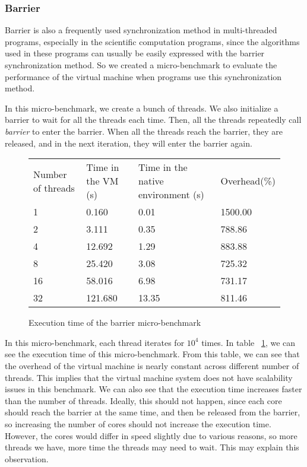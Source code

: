 \subsubsection{Barrier}
Barrier is also a frequently used synchronization method in multi-threaded
programs, especially in the scientific computation programs, since the
algorithms used in these programs can usually be easily expressed with the
barrier synchronization method. So we created a micro-benchmark to evaluate
the performance of the virtual machine when programs use this synchronization
method.

In this micro-benchmark, we create a bunch of threads. We also initialize
a barrier to wait for all the threads each time. Then, all the threads
repeatedly call {\em barrier} to enter the barrier. When all the threads
reach the barrier, they are released, and in the next iteration, they will
enter the barrier again.

\begin{figure}[here]
\begin{tabular}{  l | l | l | l }
	Number of threads & Time in the VM (s) & Time in the native environment (s) & Overhead(\%) \\
	1 & 0.160 & 0.01 & 1500.00 \\
	2 & 3.111 & 0.35 & 788.86 \\
	4 & 12.692 & 1.29 & 883.88 \\
	8 & 25.420 & 3.08 & 725.32 \\
	16 & 58.016 & 6.98 & 731.17 \\
	32 & 121.680 & 13.35 & 811.46 \\
\end{tabular}
\caption{Execution time of the barrier micro-benchmark}
\label{fig:barrier}
\end{figure}

In this micro-benchmark, each thread iterates for $10^4$ times.
In table ~\ref{fig:barrier}, we can see the execution time of this micro-benchmark.
From this table, we can see that the overhead of the virtual machine is nearly
constant across different number of threads. This implies that the virtual
machine system does not have scalability issues in this benchmark.
We can also see that the execution time increases faster than the number of
threads. Ideally, this should not happen, since each core should reach the
barrier at the same time, and then be released from the barrier, so increasing
the number of cores should not increase the execution time. However, the cores
would differ in speed slightly due to various reasons, so more threads we have, 
more time the threads may need to wait. This may explain this observation.


